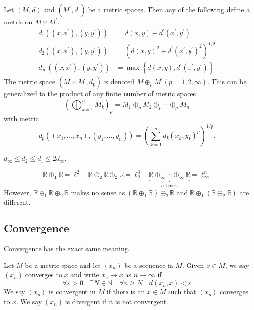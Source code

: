 \documentclass[a4paper]{article}
\begin{document}
\begin{definition}[Products]
    Let $(M, d)$ and $\left(M^{\prime}, d^{\prime}\right)$ be a metric spaces. Then any of the following define a metric on $M \times M^{\prime}:$
    \[
    \begin{aligned}
    d_{1}\left(\left(x, x^{\prime}\right),\left(y, y^{\prime}\right)\right) &=d(x, y)+d^{\prime}\left(x^{\prime}, y^{\prime}\right) \\
    d_{2}\left(\left(x, x^{\prime}\right),\left(y, y^{\prime}\right)\right) &=\left(d(x, y)^{2}+d^{\prime}\left(x^{\prime}, y^{\prime}\right)^{2}\right)^{1 / 2} \\
    d_{\infty}\left(\left(x, x^{\prime}\right),\left(y, y^{\prime}\right)\right) &=\max \left\{d(x, y), d^{\prime}\left(x^{\prime}, y^{\prime}\right)\right\}
    \end{aligned}
    \]
    The metric space $\left(M \times M^{\prime}, d_{p}\right)$ is denoted $M \oplus_{p} M^{\prime}(p=1,2, \infty)$. This can be generalized to the product of any finite number of metric spaces
    \[
        \left( \bigoplus_{k=1}^{n}M_k \right)_p = M_1 \oplus_{p}M_2\oplus_{p}\cdots\oplus_{p}M_n
    \]
    with metric
    \[
        d_p((x_1,\dots,x_n),(y_1,\dots,y_n)) = \left( \sum_{k=1}^n d_k(x_k,y_k)^p \right)^{1/p}.
    \]
\end{definition}
\begin{note}
    $d_{\infty} \leqslant d_{2} \leqslant d_{1} \leqslant 2 d_{\infty}$.
\end{note}
\begin{example}
    \[
\mathbb{R} \oplus_{1} \mathbb{R}=\ell_{1}^{2} \quad \mathbb{R} \oplus_{2} \mathbb{R} \oplus_{2} \mathbb{R}=\ell_{2}^{3} \quad \underbrace{\mathbb{R} \oplus_\infty \cdots \oplus_{\infty} \mathbb{R}}_{n \text { times }}=\ell_{\infty}^{n}
\]
However, $\mathbb{R} \oplus_{1} \mathbb{R} \oplus_{2} \mathbb{R}$ makes no sense as $\left(\mathbb{R} \oplus_{1} \mathbb{R}\right) \oplus_{2} \mathbb{R}$ and $\mathbb{R} \oplus_{1}\left(\mathbb{R} \oplus_{2} \mathbb{R}\right)$ are different.
\end{example}
\subsection{Convergence}
Convergence has the exact same meaning. 
\begin{definition}[Convergence]
    Let $M$ be a metric space and let $\left(x_{n}\right)$ be a sequence in $M$. Given $x \in M$, we say $\left(x_{n}\right)$ converges to $x$ and write $x_{n} \rightarrow x$ as $n \rightarrow \infty$ if
    \[
    \forall \varepsilon>0 \quad \exists N \in \mathbb{N} \quad \forall n \geqslant N \quad d\left(x_{n}, x\right)<\varepsilon
    \]
    We say $\left(x_{n}\right)$ is convergent in $M$ if there is an $x \in M$ such that $\left(x_{n}\right)$ converges to $x$. We say $\left(x_{n}\right)$ is divergent if it is not convergent.
\end{definition}
\end{document}
